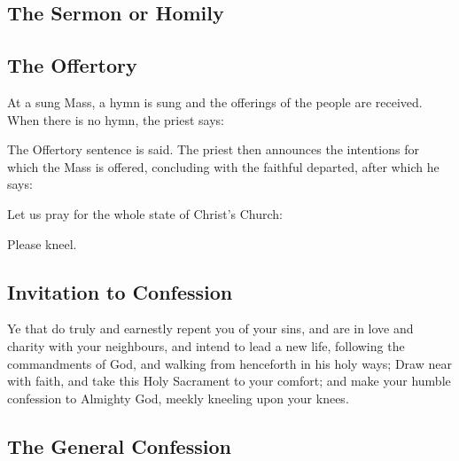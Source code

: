\subsection{The Sermon or Homily}

\subsection{The Offertory}

\begin{rubric}
At a sung Mass, a hymn is sung and the offerings of the people are received.
When there is no hymn, the priest says:
\end{rubric}
\begin{rubric}
The Offertory sentence is said.
The priest then announces the intentions for which the Mass is offered,
concluding with the faithful departed, after which he says:
\end{rubric}

Let us pray for the whole state of Christ's Church:
\begin{rubric}
Please kneel.
\end{rubric}

\subsection{Invitation to Confession}

Ye that do truly and earnestly repent you of your sins, and are in love and charity
with your neighbours, and intend to lead a new life, following the
commandments of God, and walking from henceforth in his holy ways; Draw
near with faith, and take this Holy Sacrament to your comfort; and make your
humble confession to Almighty God, meekly kneeling upon your knees.

\subsection{The General Confession}


